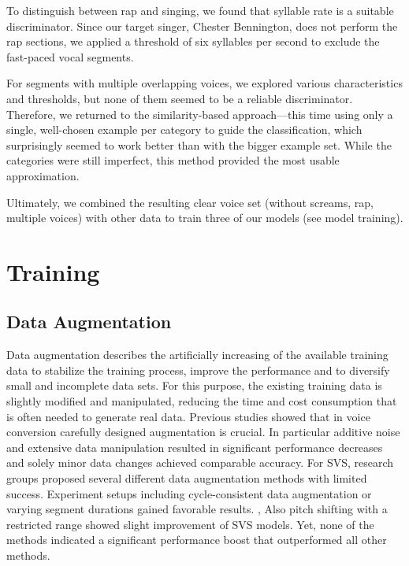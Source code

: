 \documentclass[a4paper]{article}
\begin{document}
	To distinguish between rap and singing, we found that syllable rate is a suitable discriminator. Since our target singer, Chester Bennington, does not perform the rap sections, we applied a threshold of six syllables per second to exclude the fast-paced vocal segments.
	
	For segments with multiple overlapping voices, we explored various characteristics and thresholds, but none of them seemed to be a reliable discriminator. Therefore, we returned to the similarity-based approach—this time using only a single, well-chosen example per category to guide the classification, which surprisingly seemed to work better than with the bigger example set. While the categories were still imperfect, this method provided the most usable approximation.
	
	Ultimately, we combined the resulting clear voice set (without screams, rap, multiple voices) with other data to train three of our models (see model training).
	
	
	
	
	\newpage
	
	\section{Training}
	
	\subsection{Data Augmentation}
	
	Data augmentation describes the artificially increasing of the available training data to stabilize the training process, improve the performance and to diversify small and incomplete data sets. For this purpose, the existing training data is slightly modified and manipulated, reducing the  time and cost consumption that is often needed to generate real data. Previous studies showed that in voice conversion carefully designed augmentation is crucial. In particular additive noise and extensive data manipulation resulted in significant performance decreases and solely minor data changes achieved comparable accuracy. \cite{Slizovskaia2022}  For SVS, research groups proposed several different data augmentation methods with limited success. Experiment setups including cycle-consistent data augmentation or varying segment durations gained favorable results. \cite{Guo2022},\cite{Zhang2022} Also pitch shifting with a restricted range showed slight improvement of SVS models. \cite{Guo2022} Yet, none of the methods indicated a significant performance boost that outperformed all other methods. 
	
\end{document}
